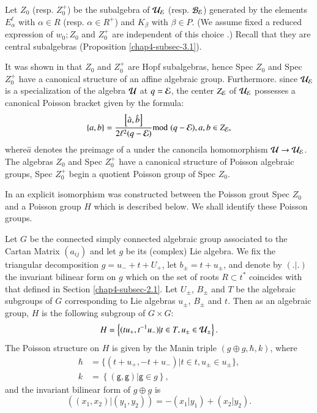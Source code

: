 Let $Z_{0}$ (resp. $Z_{0}^{+}$) be the subalgebra of $\mathcal{U}_{\mathcal{E}}$ (resp. $\mathcal{B}_{\mathcal{E}}$) generated by the elements $E_{\alpha}^{\ell}$ with $\alpha \in R$ (resp. $\alpha \in R^{+}$) and $K_{\beta}$ with $\beta \in P$. (We assume fixed a reduced expression of $w_{0}; Z_{0}$ and $Z_{0}^{+}$ are independent of this choice \cite{chap4-keyDK1}.) Recall that they are central subalgebras (Proposition \ref{chap4-subsec-3.1}).

It was shown in \cite{chap4-keyDK1} that $Z_{0}$ and $Z_{0}^{+}$ are Hopf subalgebras, hence Spec $Z_{0}$ and Spec $Z_{0}^{+}$ have a canonical structure of an affine algebraic group. Furthermore. since $\mathcal{U}_{\mathcal{E}}$ is a specialization of the algebra $\mathcal{U}$ at $q = \mathcal{E}$, the center $Z_{\mathcal{E}}$ of $\mathcal{U}_{\mathcal{E}}$ possesses a canonical Poisson bracket given by the formula:
$$
\{a, b\} =\dfrac{\left[\hat{a}, \hat{b}\right]}{2\ell^{2}(q-\mathcal{E})}{\rm{mod}}\kern.3em (q-\mathcal{E}), a, b \in Z_{\mathcal{E}},
$$
where\pageoriginale $\hat{a}$ denotes the preimage of a under the canoncila homomorphism $\mathcal{U} \rightarrow \mathcal{U}_{\mathcal{E}}$. The algebras $Z_{0}$ and Spec $Z_{0}^{+}$ have a canonical structure of Poisson algebraic groups, Spec $Z_{0}^{+}$ begin a quotient Poisson group of Spec $Z_{0}$.

In \cite{chap4-keyDKP1} an explicit isomorphism was constructed between the Poisson grout Spec $Z_{0}$ and a Poisson group $H$ which is described below. We shall identify these Poisson groups.

Let $G$ be the connected simply connected algebraic group associated to the Cartan Matrix $(a_{ij})$ and let $g$ be its (complex) Lie algebra. We fix the triangular decomposition $g=u_{-} + t + U_{+}$, let $b_{\pm} = t + u_{\pm}$, and denote by $(. | .)$ the invariant bilinear form on $g$ which on the set of roots $R\subset t^{*}$ coincides with that defined in Section \ref{chap4-subsec-2.1}. Let $U_{\pm}$, $B_{\pm}$ and $T$ be the algebraic subgroups of $G$ corresponding to Lie algebras $u_{\pm}$, $B_{\pm}$ and $t$. Then as an algebraic group, $H$ is the following subgroup of $G\times G$:
$$
H = \left\{(tu_{+}, t^{-1}u_{-}) | t \in T, u_{\pm} \in \mathcal{U}_{\pm}\right\}.
$$ 
The Poisson structure on $H$ is given by the Manin triple $(g \oplus g, \hbar, k)$, where 
\begin{align*}
\hbar &= \{(t +u_{+}, -t+ u_{-}) | t\in t, u_{\pm} \in u_{\pm}\},\\ 
k &= \left\{(\mathsf{g},\mathsf{g}) |  \mathsf{g} \in g\right\},
\end{align*}
and the invariant bilinear form of $g\oplus g$ is 
$$
((x_{1}, x_{2})| (y_{1}, y_{2})) = -(x_{1}| y_{1}) + (x_{2} | y_{2}).
$$

